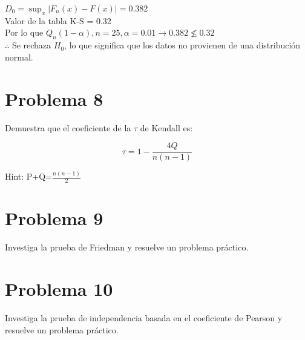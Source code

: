 \documentclass{article}
\begin{document}
$D_0 = \sup_x |F_n(x) - F(x)| = 0.382$ \\
Valor de la tabla K-S = 0.32 \\
Por lo que $Q_n(1-\alpha), n=25, \alpha=0.01 \rightarrow 0.382 \not\leq 0.32$ \\
$\therefore$ Se rechaza $H_0$, lo que significa que los datos no provienen de una distribución normal.

\section{Problema 8}

Demuestra que el coeficiente de la $\tau$ de Kendall es:

$$\tau=1-\frac{4Q}{n(n-1)}$$

Hint: P+Q=$\frac{n(n-1)}{2}$

\section{Problema 9}

Investiga la prueba de Friedman y resuelve un problema práctico.

\section{Problema 10}

Investiga la prueba de independencia basada en el coeficiente de Pearson y resuelve un problema práctico.
\end{document}
